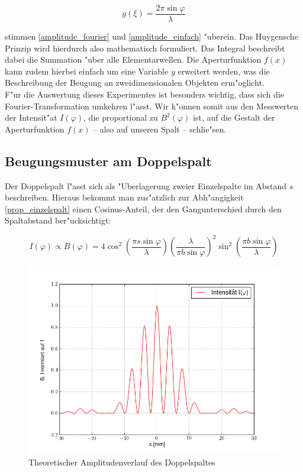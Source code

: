 		\begin{equation}
			g(\xi) = \frac{2 \pi \sin{\varphi}}{\lambda}
		\end{equation}

		stimmen \ref{amplitude_fourier} und \ref{amplitude_einfach} "uberein.
		Das Huygensche Prinzip wird hierdurch also mathematisch formuliert.
		Das Integral beschreibt dabei die Summation "uber alle Elementarwellen.
		Die Aperturfunktion $f(x)$ kann zudem hierbei einfach um eine Variable $y$ erweitert werden,
		was die Beschreibung der Beugung an zweidimensionalen Objekten erm"oglicht. \\
		F"ur die Auswertung dieses Experimentes ist besonders wichtig, dass sich die Fourier-Transformation umkehren l"asst.
		Wir k"onnen somit aus den Messwerten der Intensit"at $I(\varphi)$,
		die proportional zu $B^2(\varphi)$ ist, auf die Gestalt der Aperturfunktion $f(x)$
		--  also auf unseren Spalt -- schlie"sen.
		
	\subsection{Beugungsmuster am Doppelspalt}
		\label{sec:muster_doppelspalt}

		Der Doppelspalt l"asst sich als "Uberlagerung zweier Einzelspalte im Abstand $s$ beschreiben.
		Hieraus bekommt man zus"atzlich zur Abh"angigkeit \ref{prop_einzelspalt} einen Cosinus-Anteil,
		der den Gangunterschied durch den Spaltabstand ber"ucksichtigt:

		\begin{equation}
			I(\varphi) \propto B(\varphi) = 
			4 \cos^2{\left( \frac{\pi s \sin{\varphi}}{\lambda} \right)}
			\left( \frac{\lambda}{\pi b \sin{\varphi}} \right)^2
			\sin^2{\left( \frac{\pi b \sin{\varphi}}{\lambda} \right)}
			\label{prop_doppelspalt}
		\end{equation}

		\begin{figure}[h]
			\centering
			\includegraphics[width = 15cm]{theorie_2.png}
			\caption{Theoretischer Amplitudenverlauf des Doppelspaltes}
			\label{theoriekurve_doppelspalt}
		\end{figure}
